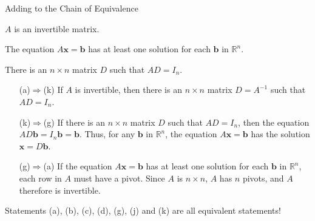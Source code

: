 \documentclass[xcolor=dvipsnames,aspectratio=169,t]{beamer}
\begin{document}
\begin{frame}{Adding to the Chain of Equivalence}

 \bb[(a)]
  \ii $A$ is an invertible matrix.
  \addtocounter{enumi}{5}
  \ii The equation $A \mathbf{x} = \mathbf{b}$ has at least one solution for each $\mathbf{b}$ in $\mathbb{R}^n$.
  \addtocounter{enumi}{3}
  \ii There is an $n \times n$ matrix $D$ such that $AD = I_n$.
  \ee
  \bigskip

  \pause
  \begingroup\addtolength{\leftmargini}{2em}
  \begin{itemize}
    \item[(a)$\Rightarrow$(k)] If $A$ is invertible, then there is an $n \times n$ matrix $D=A^{-1}$ such that $AD = I_n$.
    \item[(k)$\Rightarrow$(g)] If there is an $n \times n$ matrix $D$ such that $AD = I_n$, then the equation $AD \mathbf{b} = I_n \mathbf{b}=\mathbf{b}$. Thus, for any $\mathbf{b}$ in $\mathbb{R}^n$, the equation $A \mathbf{x} = \mathbf{b}$ has the solution $\mathbf{x} = D \mathbf{b}$.
    \item[(g)$\Rightarrow$(a)] If the equation $A \mathbf{x} = \mathbf{b}$ has at least one solution for each $\mathbf{b}$ in $\mathbb{R}^n$, each row in $A$ must have a pivot.
    Since $A$ is $n\times n$, $A$ has $n$ pivots, and $A$ therefore is invertible.
  \end{itemize}
  \endgroup
  \bigskip

  \pause
  \alert{Statements (a), (b), (c), (d),  (g), (j)  and (k) are all equivalent statements!}
\end{frame}

% 
%   
% 
%   
\end{document}

